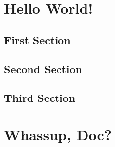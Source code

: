 \documentclass[11pt,twoside,openany,svgnames,x11names]{book}
\newcommand\chapterillustration{}
\begin{document}
\pagestyle{headings}

\renewcommand\chapterillustration{six-computers-chips-circuits}
\chapter{Hello World!}
\section{First Section}
\lipsum[1-6]

\section{Second Section}
\lipsum[7-11]

\section{Third Section}
\lipsum[12-15]

\renewcommand\chapterillustration{cherry-tomatos}
\chapter{Whassup, Doc?}
\lipsum[5-6]
\end{document}
